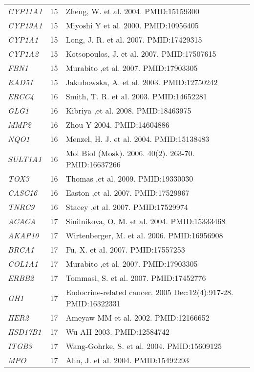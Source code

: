 \documentclass[10pt]{article}
\begin{document}
\begin{landscape}
\begin{center}
\begin{longtable}[H]{lcl}
\textit{CYP11A1} & 15 & Zheng, W.  et al. 2004. PMID:15159300\\[2pt]
\textit{CYP19A1} & 15 & Miyoshi Y et al. 2000. PMID:10956405\\[2pt]
\textit{CYP1A1} & 15 & Long, J. R.  et al. 2007. PMID:17429315\\[2pt]
\textit{CYP1A2} & 15 & Kotsopoulos, J.  et al. 2007. PMID:17507615\\[2pt]
\textit{FBN1} & 15 & Murabito ,et al. 2007. PMID:17903305\\[2pt]
\textit{RAD51} & 15 & Jakubowska, A.  et al. 2003. PMID:12750242\\[2pt]
\textit{ERCC4} & 16 & Smith, T. R.  et al. 2003. PMID:14652281\\[2pt]
\textit{GLG1} & 16 & Kibriya ,et al. 2008. PMID:18463975\\[2pt]
\textit{MMP2} & 16 & Zhou Y 2004. PMID:14604886\\[2pt]
\textit{NQO1} & 16 & Menzel, H. J.  et al. 2004. PMID:15138483\\[2pt]
\textit{SULT1A1} & 16 & Mol Biol (Mosk). 2006. 40(2). 263-70. PMID:16637266\\[2pt]
\textit{TOX3} & 16 & Thomas ,et al. 2009. PMID:19330030\\[2pt]
\textit{CASC16} & 16 & Easton ,et al. 2007. PMID:17529967\\[2pt]
\textit{TNRC9} & 16 & Stacey ,et al. 2007. PMID:17529974\\[2pt]
\textit{ACACA} & 17 & Sinilnikova, O. M.  et al. 2004. PMID:15333468\\[2pt]
\textit{AKAP10} & 17 & Wirtenberger, M.  et al. 2006. PMID:16956908\\[2pt]
\textit{BRCA1} & 17 & Fu, X.  et al. 2007. PMID:17557253\\[2pt]
\textit{COL1A1} & 17 & Murabito ,et al. 2007. PMID:17903305\\[2pt]
\textit{ERBB2} & 17 & Tommasi, S.  et al. 2007. PMID:17452776\\[2pt]
\textit{GH1} & 17 & Endocrine-related cancer. 2005 Dec:12(4):917-28. PMID:16322331\\[2pt]
\textit{HER2} & 17 & Ameyaw MM et al. 2002. PMID:12166652\\[2pt]
\textit{HSD17B1} & 17 & Wu AH 2003. PMID:12584742\\[2pt]
\textit{ITGB3} & 17 & Wang-Gohrke, S.  et al. 2004. PMID:15609125\\[2pt]
\textit{MPO} & 17 & Ahn, J.  et al. 2004. PMID:15492293\\[2pt]

\end{longtable}
\end{center}
\end{landscape}
\end{document}

